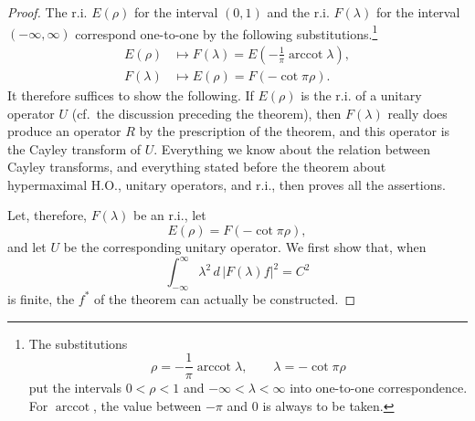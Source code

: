 ﻿\documentclass[paper=b5,fontsize=13pt,bookmarkpackage=false,twoside]{scrartcl}
\begin{document}
\begin{proof}
The r.i. $E(\rho)$ for the interval $(0,1)$ and the r.i. $F(\lambda)$ for the interval $(-\infty,\infty)$ correspond one-to-one by the following substitutions.\footnote{\label{fn:50}The substitutions
\[
\rho=-\frac1\pi\operatorname{arccot}\lambda,
\qquad
\lambda=-\cot\pi\rho
\]
put the intervals $0<\rho<1$ and $-\infty<\lambda<\infty$ into one-to-one correspondence. For $\operatorname{arccot}$, the value between $-\pi$ and $0$ is always to be taken.}
\begin{align*}
E(\rho)&\longmapsto
F(\lambda)=E\left(-\frac1\pi\operatorname{arccot}\lambda\right),\\
F(\lambda)&\longmapsto
E(\rho)=F(-\cot\pi\rho).
\end{align*}
It therefore suffices to show the following. If $E(\rho)$ is the r.i. of a unitary operator $U$ (cf.\ the discussion preceding the theorem), then $F(\lambda)$ really does produce an operator $R$ by the prescription of the theorem, and this operator is the Cayley transform of $U$. Everything we know about the relation between Cayley transforms, and everything stated before the theorem about hypermaximal H.O., unitary operators, and r.i., then proves all the assertions.

Let, therefore, $F(\lambda)$ be an r.i., let
\[
E(\rho)=F(-\cot\pi\rho),
\]
and let $U$ be the corresponding unitary operator. We first show that, when
\[
\int_{-\infty}^{\infty}\lambda^2\,d\,|F(\lambda)f|^2=C^2
\]
is finite, the $f^*$ of the theorem can actually be constructed.


\end{proof}
\end{document}
